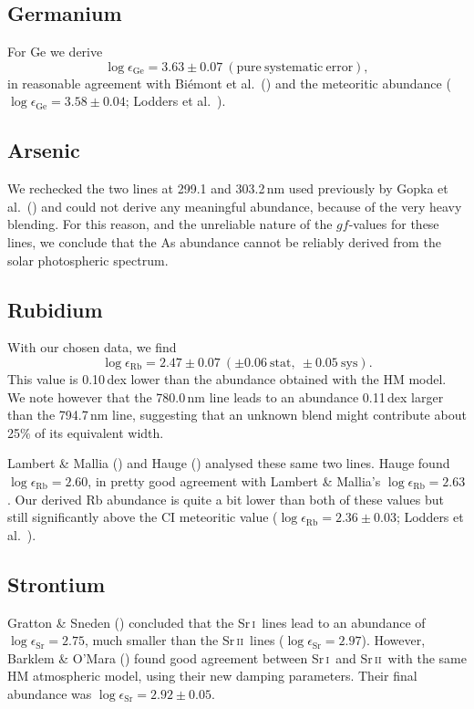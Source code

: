 \documentclass[traditabstract]{aa}
\newcommand{\altsri}{Sr\,\textsc{i}}
\newcommand{\altsrii}{Sr\,\textsc{ii}}
\newcommand{\sri}{\altsri\ }
\newcommand{\srii}{\altsrii\ }
\begin{document}
\subsection{Germanium}
For Ge we derive 
\begin{displaymath}
\log \epsilon_{\mathrm{Ge}}= 3.63\pm0.07\ \mathrm{(pure\ systematic\ error)},
\end{displaymath}
in reasonable agreement with Bi\'emont et al.\ (\cite{biem2}) and the meteoritic abundance ($\log\epsilon_{\mathrm{Ge}}=3.58\pm0.04$; Lodders et al.\ \cite{lodd}).

\subsection{Arsenic}
We rechecked the two lines at 299.1 and 303.2\,nm used previously by Gopka et al.\ (\cite{gopka}) and could not derive any meaningful abundance, because of the very heavy blending. For this reason, and the unreliable nature of the $gf$-values for these lines, we conclude that the As abundance cannot be reliably derived from the solar photospheric spectrum.

\subsection{Rubidium}
With our chosen data, we find
\begin{displaymath}
\log\epsilon_{\mathrm{Rb}}=2.47\pm0.07\ (\pm0.06\ \mathrm{stat},\ \pm0.05\ \mathrm{sys}).
\end{displaymath}
This value is 0.10\,dex lower than the abundance obtained with the HM model. We note however that the 780.0\,nm line leads to an abundance 0.11\,dex larger than the 794.7\,nm line, suggesting that an unknown blend might contribute about 25$\%$ of its equivalent width.

Lambert \& Mallia (\cite{lamb3}) and Hauge (\cite{hauge}) analysed these same two lines.  Hauge found $\log\epsilon_{\mathrm{Rb}}=2.60$, in pretty good agreement with Lambert \& Mallia's $\log\epsilon_{\mathrm{Rb}}=2.63$.  Our derived Rb abundance is quite a bit lower than both of these values but still significantly above the CI meteoritic value ($\log\epsilon_{\mathrm{Rb}}=2.36\pm0.03$; Lodders et al.\ \cite{lodd}).

\subsection{Strontium}
Gratton \& Sneden (\cite{grat}) concluded that the \sri lines lead to an abundance of $\log\epsilon_{\mathrm{Sr}}=2.75$, much smaller than the \srii lines ($\log\epsilon_{\mathrm{Sr}}=2.97$).  However, Barklem \& O'Mara (\cite{bark2}) found good agreement between \sri and \srii with the same HM atmospheric model, using their new damping parameters.  Their final abundance was $\log\epsilon_{\mathrm{Sr}}=2.92\pm0.05$. 
\end{document}
